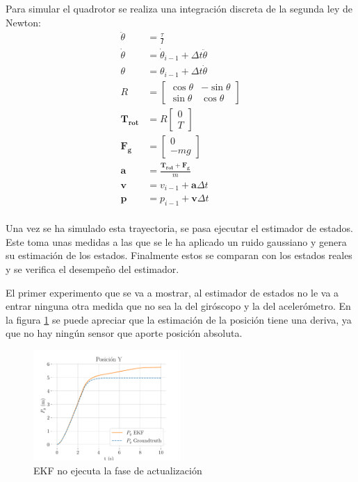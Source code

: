 Para simular el quadrotor se realiza una integración discreta de la segunda ley de Newton:
\begin{align}
        \ddot{\theta} &= \frac{\tau}{I} \\
        \dot{\theta} &= \dot{\theta}_{i-1} + \Delta t \ddot{\theta} \\
        \theta &= \theta_{i-1} + \Delta t \dot{\theta} \\
        R &= 
\begin{bmatrix}
\cos{\theta}& -\sin{\theta}\\
\sin{\theta} & \cos{\theta}
\end{bmatrix}\\
         \bm{T_{rot}}&= R  \begin{bmatrix}0\\ T \end{bmatrix}\\
         \bm{F_g}&= \begin{bmatrix}0\\ -m g \end{bmatrix}\\
         \bm{a}& = \frac{\bm{T_{rot}}+\bm{F_g}}{m}\\
         \bm{v}& = v_{i-1} + \bm{a}\Delta t  \\
        \bm{p} &= p_{i-1} + \bm{v}\Delta t  \\
\end{align}


Una vez se ha simulado esta trayectoria, se pasa ejecutar el estimador de estados. Este toma unas medidas a las que se le ha aplicado un ruido gaussiano y genera su estimación de los estados. Finalmente estos se comparan con los estados reales y se verifica el desempeño del estimador. 

El primer experimento que se va a mostrar, al estimador de estados no le va a entrar ninguna otra medida que no sea la del giróscopo y la del acelerómetro. En la figura \ref{fig:simu1} se puede apreciar que la estimación de la posición tiene una deriva, ya que no hay ningún sensor que aporte posición absoluta. 


\begin{figure}[b]	
	\centering
		\centering
		\includegraphics[width=0.5\textwidth]{estimador_px4/im_simu/n_update/y_t}
	\quad
	\caption{EKF no ejecuta la fase de actualización}
	\label{fig:simu1}
\end{figure}


